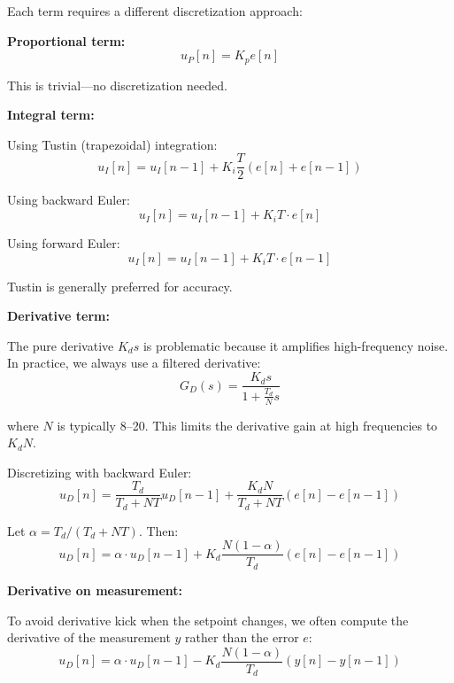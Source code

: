 Each term requires a different discretization approach:

\textbf{Proportional term:}
\begin{equation}
u_P[n] = K_p e[n]
\end{equation}

This is trivial---no discretization needed.

\textbf{Integral term:}

Using Tustin (trapezoidal) integration:
\begin{equation}
u_I[n] = u_I[n-1] + K_i \frac{T}{2}(e[n] + e[n-1])
\end{equation}

Using backward Euler:
\begin{equation}
u_I[n] = u_I[n-1] + K_i T \cdot e[n]
\end{equation}

Using forward Euler:
\begin{equation}
u_I[n] = u_I[n-1] + K_i T \cdot e[n-1]
\end{equation}

Tustin is generally preferred for accuracy.

\textbf{Derivative term:}

The pure derivative $K_d s$ is problematic because it amplifies high-frequency noise. In practice, we always use a filtered derivative:
\begin{equation}
G_D(s) = \frac{K_d s}{1 + \frac{T_d}{N}s}
\end{equation}

where $N$ is typically 8--20. This limits the derivative gain at high frequencies to $K_d N$.

Discretizing with backward Euler:
\begin{equation}
u_D[n] = \frac{T_d}{T_d + NT}u_D[n-1] + \frac{K_d N}{T_d + NT}(e[n] - e[n-1])
\end{equation}

Let $\alpha = T_d/(T_d + NT)$. Then:
\begin{equation}
u_D[n] = \alpha \cdot u_D[n-1] + K_d \frac{N(1-\alpha)}{T_d}(e[n] - e[n-1])
\end{equation}

\textbf{Derivative on measurement:}

To avoid derivative kick when the setpoint changes, we often compute the derivative of the measurement $y$ rather than the error $e$:
\begin{equation}
u_D[n] = \alpha \cdot u_D[n-1] - K_d \frac{N(1-\alpha)}{T_d}(y[n] - y[n-1])
\end{equation}

